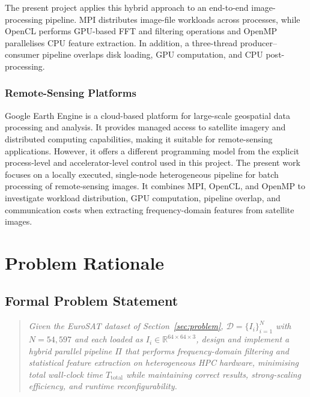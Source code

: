 \documentclass[a4paper,12pt]{report}
\begin{document}
The present project applies this hybrid approach to an end-to-end image-processing
pipeline. MPI distributes image-file workloads across processes, while OpenCL
performs GPU-based FFT and filtering operations and OpenMP parallelises CPU feature
extraction. In addition, a three-thread producer--consumer pipeline overlaps disk
loading, GPU computation, and CPU post-processing.

\subsection{Remote-Sensing Platforms}

Google Earth Engine \cite{gorelick2017} is a cloud-based platform for large-scale
geospatial data processing and analysis. It provides managed access to satellite
imagery and distributed computing capabilities, making it suitable for
remote-sensing applications. However, it offers a different programming model from
the explicit process-level and accelerator-level control used in this project. The
present work focuses on a locally executed, single-node heterogeneous pipeline for
batch processing of remote-sensing images. It combines MPI, OpenCL, and OpenMP to
investigate workload distribution, GPU computation, pipeline overlap, and
communication costs when extracting frequency-domain features from satellite images.

\chapter{Problem Rationale}
\label{chap:rationale}

\section{Formal Problem Statement}

\begin{quote}\slshape
Given the EuroSAT dataset of Section~\ref{sec:problem},
$\mathcal{D} = \{I_i\}_{i=1}^{N}$ with
$N = 54{,}597$ and each loaded as $I_i \in \mathbb{R}^{64 \times 64 \times 3}$,
design and implement a hybrid parallel pipeline $\Pi$ that performs
frequency-domain filtering and statistical feature extraction on
heterogeneous HPC hardware, minimising total wall-clock time
$T_{\mathrm{total}}$ while maintaining correct results, strong-scaling
efficiency, and runtime reconfigurability.
\end{quote}
\end{document}
